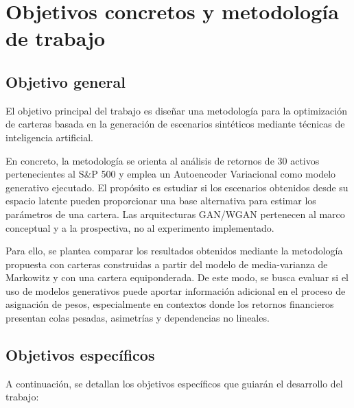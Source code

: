 \clearpage
\chapter{Objetivos concretos y metodología de trabajo}

\section{Objetivo general}

El objetivo principal del trabajo es diseñar una metodología para la optimización de carteras basada en la generación de escenarios sintéticos mediante técnicas de inteligencia artificial.

En concreto, la metodología se orienta al análisis de retornos de 30 activos pertenecientes al S\&P 500 y emplea un Autoencoder Variacional como modelo generativo ejecutado. El propósito es estudiar si los escenarios obtenidos desde su espacio latente pueden proporcionar una base alternativa para estimar los parámetros de una cartera. Las arquitecturas GAN/WGAN pertenecen al marco conceptual y a la prospectiva, no al experimento implementado.

Para ello, se plantea comparar los resultados obtenidos mediante la metodología propuesta con carteras construidas a partir del modelo de media-varianza de Markowitz y con una cartera equiponderada. De este modo, se busca evaluar si el uso de modelos generativos puede aportar información adicional en el proceso de asignación de pesos, especialmente en contextos donde los retornos financieros presentan colas pesadas, asimetrías y dependencias no lineales.

\section{Objetivos específicos}

A continuación, se detallan los objetivos específicos que guiarán el desarrollo del trabajo:

